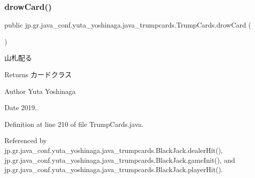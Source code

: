 \subsubsection{\texorpdfstring{drow\+Card()}{drowCard()}}
{\footnotesize\ttfamily public jp.\+gr.\+java\+\_\+conf.\+yuta\+\_\+yoshinaga.\+java\+\_\+trumpcards.\+Trump\+Cards.\+drow\+Card (\begin{DoxyParamCaption}{ }\end{DoxyParamCaption})}



山札配る 

\begin{DoxyReturn}{Returns}
カードクラス 
\end{DoxyReturn}
\begin{DoxyAuthor}{Author}
Yuta Yoshinaga 
\end{DoxyAuthor}
\begin{DoxyDate}{Date}
2019.. 
\end{DoxyDate}


Definition at line 210 of file Trump\+Cards.\+java.



Referenced by jp.\+gr.\+java\+\_\+conf.\+yuta\+\_\+yoshinaga.\+java\+\_\+trumpcards.\+Black\+Jack.\+dealer\+Hit(), jp.\+gr.\+java\+\_\+conf.\+yuta\+\_\+yoshinaga.\+java\+\_\+trumpcards.\+Black\+Jack.\+game\+Init(), and jp.\+gr.\+java\+\_\+conf.\+yuta\+\_\+yoshinaga.\+java\+\_\+trumpcards.\+Black\+Jack.\+player\+Hit().

